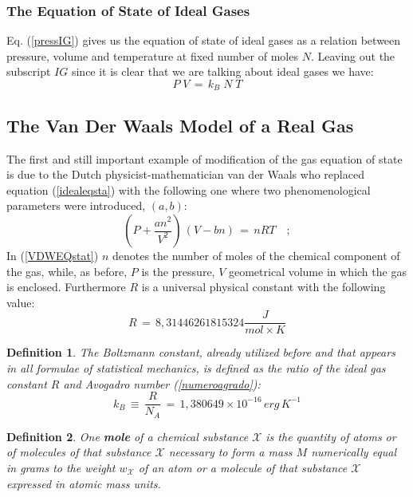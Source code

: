 \documentclass[10pt,a4paper]{article}
\newtheorem{definizione}{Definition}[section]
\begin{document}
\subsubsection{The Equation of State of Ideal Gases}
\label{Osserinfero}  Eq. (\ref{pressIG}) gives us the equation of state of ideal gases as a relation between pressure, volume and temperature at fixed number of moles $N$.
Leaving out the subscript $IG$ since it is clear that we are talking about ideal gases we have:
\begin{equation}\label{idealeqsta}
    P\;V \, = \, k_B \; N \; T
\end{equation}
\subsection{The Van Der Waals Model of a Real Gas}
\label{vandervallus}
The first and still important example of modification of the gas equation of state is due to the Dutch physicist-mathematician van der Waals  who replaced equation (\ref{idealeqsta}) with the following one
where two phenomenological parameters were introduced, $(a,b)$:
\begin{equation}\label{VDWEQstat}
     \left(P+\frac{a n^2}{V^2}\right)\, (V-b n)\,= \, n R T \quad;
\end{equation}
In (\ref{VDWEQstat}) $n$ denotes the number of moles of the chemical component of the gas, while, as before, $P$ is the pressure, $V$ geometrical volume in which the gas is enclosed. Furthermore  $R$ is a universal physical constant with the following value:
\begin{equation}\label{valorediR}
    R \, = \, 8,31446261815324 \frac{J}{mol \times K}
\end{equation}
\begin{definizione}
\label{bolzmanno} The Boltzmann constant, already utilized before and  that appears in all formulae of
statistical mechanics, is  defined as
the ratio of the ideal gas constant $R$  and Avogadro number
(\ref{numeroagrado}):
\begin{equation}\label{kBdefi}
    k_B \, \equiv \, \frac{R}{N_A} \, = \, 1,380649 \times 10^{-16}
    \, erg \, K^{-1}
\end{equation}
\end{definizione}
\begin{definizione}
\label{mole} One \textbf{mole} of a chemical substance $\mathcal{X}$ is
the quantity of  atoms or of molecules of that substance $\mathcal{X}$
necessary to form  a mass $\mathit{M}$  numerically equal in grams
to the weight  $w_\mathcal{X}$  of an atom or a  molecule of that substance
$\mathcal{X}$ expressed in atomic mass units.
\end{definizione}
\end{document}
